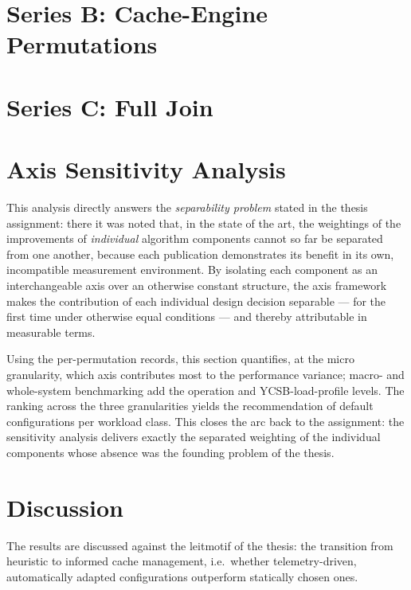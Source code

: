 \section{Series B\@: Cache-Engine Permutations}\label{sec:result-b}

% 

\section{Series C\@: Full Join}\label{sec:result-c}

% 

\section{Axis Sensitivity Analysis}\label{sec:sensitivity}

This analysis directly answers the \emph{separability problem} stated in the thesis assignment:
there it was noted that, in the state of the art, the weightings of the improvements of
\emph{individual} algorithm components cannot so far be separated from one another, because each
publication demonstrates its benefit in its own, incompatible measurement environment. By isolating
each component as an interchangeable axis over an otherwise constant structure, the axis framework
makes the contribution of each individual design decision separable --- for the first time under
otherwise equal conditions --- and thereby attributable in measurable terms.

Using the per-permutation records, this section quantifies, at the micro granularity, which axis
contributes most to the performance variance; macro- and whole-system benchmarking add the operation
and YCSB-load-profile levels. The ranking across the three granularities yields the recommendation
of default configurations per workload class. This closes the arc back to the assignment: the
sensitivity analysis delivers exactly the separated weighting of the individual components whose
absence was the founding problem of the thesis.

\section{Discussion}\label{sec:discussion}

The results are discussed against the leitmotif of the thesis: the transition from heuristic to
informed cache management, i.e.\ whether telemetry-driven, automatically adapted configurations
outperform statically chosen ones.
